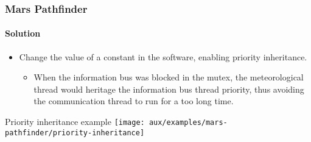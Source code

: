 \begin{frame}[hasprev=true, hasnext=false]
\frametitle{Mars Pathfinder}
\framesubtitle{Solution}

\begin{itemize}
	\item Change the value of a constant in the software, enabling priority
	inheritance.
	\begin{itemize}
		\item When the information bus was blocked in the mutex, the
		meteorological thread would heritage the information bus thread
		priority, thus avoiding the communication thread to run for a too
		long time.
	\end{itemize}
\end{itemize}

\begin{block:ie}{Priority inheritance example}
	\centering
	\texttt{[image: aux/examples/mars-pathfinder/priority-inheritance]}
\end{block:ie}

\end{frame}